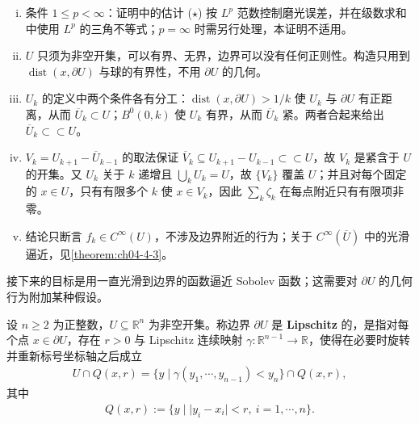 \documentclass[../../main.tex]{subfiles}%
\begin{document}
\begin{remark}\label{remark:ch04-thm-4-2-条件}
\begin{enumerate}[(i)]
\item 条件 $1\leqslant p<\infty$：证明中的估计 ($\star$) 按 $L^p$ 范数控制磨光误差，并在级数求和中使用 $L^p$ 的三角不等式；$p=\infty$ 时需另行处理，本证明不适用。
\item $U$ 只须为非空开集，可以有界、无界，边界可以没有任何正则性。构造只用到 $\operatorname{dist}(x,\partial U)$ 与球的有界性，不用 $\partial U$ 的几何。
\item $U_k$ 的定义中两个条件各有分工：$\operatorname{dist}(x,\partial U)>1/k$ 使 $U_k$ 与 $\partial U$ 有正距离，从而 $\overline{U}_k\subset U$；$B^0(0,k)$ 使 $U_k$ 有界，从而 $\overline{U}_k$ 紧。两者合起来给出 $\overline{U}_k\subset\subset U$。
\item $V_k=U_{k+1}-\overline{U}_{k-1}$ 的取法保证 $\overline{V}_k\subseteq U_{k+1}-U_{k-1}\subset\subset U$，故 $V_k$ 是紧含于 $U$ 的开集。又 $U_k$ 关于 $k$ 递增且 $\bigcup_kU_k=U$，故 $\{V_k\}$ 覆盖 $U$；并且对每个固定的 $x\in U$，只有有限多个 $k$ 使 $x\in V_k$，因此 $\sum_k\zeta_k$ 在每点附近只有有限项非零。
\item 结论只断言 $f_k\in C^\infty(U)$，不涉及边界附近的行为；关于 $C^\infty(\overline{U})$ 中的光滑逼近，见\cref{theorem:ch04-4-3}。 %
\end{enumerate}
\end{remark}

接下来的目标是用一直光滑到边界的函数逼近 Sobolev 函数；这需要对 $\partial U$ 的几何行为附加某种假设。

\begin{definition}[Lipschitz 边界]\label{definition:ch04-4-4}
设 $n\geqslant2$ 为正整数，$U\subseteq\mathbb{R}^n$ 为非空开集。称边界 $\partial U$ 是 \textbf{Lipschitz} 的，是指对每个点 $x\in\partial U$，存在 $r>0$ 与 Lipschitz 连续映射 $\gamma:\mathbb{R}^{n-1}\to\mathbb{R}$，使得在必要时旋转并重新标号坐标轴之后成立
\begin{align*}
U\cap Q(x,r)=\{y\mid\gamma(y_1,\cdots,y_{n-1})<y_n\}\cap Q(x,r),
\end{align*}
其中
\begin{align*}
Q(x,r):=\{y\mid\lvert y_i-x_i\rvert<r,\ i=1,\cdots,n\}.
\end{align*}
\end{definition}
\end{document}
